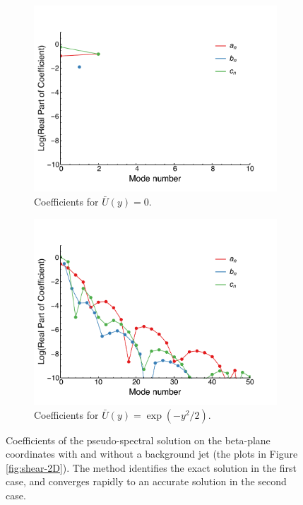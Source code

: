 \begin{figure}
    \centering
  \begin{subfigure}[b]{0.4\textwidth}
    \includegraphics[width=\textwidth]{figures/appendices/zero-shear-hermite-accuracy.pdf}
    \caption{Coefficients for $\bar{U}(y)=0$.}
  \end{subfigure}
  \begin{subfigure}[b]{0.4\textwidth}
    \includegraphics[width=\textwidth]{figures/appendices/shear-hermite-accuracy.pdf}
    \caption{Coefficients for $\bar{U}(y)=\exp(-y^{2}/2)$.}
  \end{subfigure}
\caption{Coefficients of the pseudo-spectral solution on the beta-plane coordinates with and without a background jet (the plots in Figure \ref{fig:shear-2D}). The method identifies the exact solution in the first case, and converges rapidly to an accurate solution in the second case. }\label{fig:accuracy-hermite}
\end{figure}


